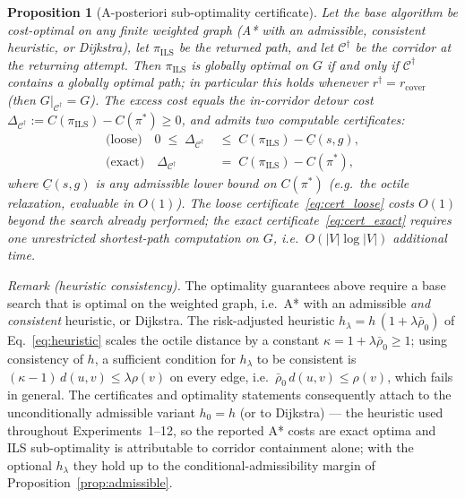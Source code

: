 \documentclass[preprint,12pt,authoryear]{elsarticle}
\newtheorem{proposition}{Proposition}
\begin{document}
\begin{proposition}[A-posteriori sub-optimality certificate]\label{prop:certificate}
Let the base algorithm be cost-optimal on any finite weighted graph (A* with an admissible, consistent heuristic, or Dijkstra), let $\pi_{\mathrm{ILS}}$ be the returned path, and let $\mathcal{C}^{\dagger}$ be the corridor at the returning attempt. Then $\pi_{\mathrm{ILS}}$ is globally optimal on $G$ if and only if $\mathcal{C}^{\dagger}$ contains a globally optimal path; in particular this holds whenever $r^{\dagger} = r_{\mathrm{cover}}$ (then $G|_{\mathcal{C}^{\dagger}} = G$). The excess cost equals the in-corridor detour cost $\Delta_{\mathcal{C}^{\dagger}} := C(\pi_{\mathrm{ILS}}) - C(\pi^*) \geq 0$, and admits two computable certificates:
\begin{align}
\text{(loose)}\quad 0 \;\leq\; \Delta_{\mathcal{C}^{\dagger}} &\;\leq\; C(\pi_{\mathrm{ILS}}) - \underline{C}(s,g), \label{eq:cert_loose}\\
\text{(exact)}\quad \Delta_{\mathcal{C}^{\dagger}} &\;=\; C(\pi_{\mathrm{ILS}}) - C(\pi^*), \label{eq:cert_exact}
\end{align}
where $\underline{C}(s,g)$ is any admissible lower bound on $C(\pi^*)$ (e.g.\ the octile relaxation, evaluable in $O(1)$). The loose certificate~\eqref{eq:cert_loose} costs $O(1)$ beyond the search already performed; the exact certificate~\eqref{eq:cert_exact} requires one unrestricted shortest-path computation on $G$, i.e.\ $O(|V|\log|V|)$ additional time.
\end{proposition}

\noindent\textit{Remark (heuristic consistency).}
The optimality guarantees above require a base search that is optimal on the weighted graph, i.e.\ A* with an admissible \emph{and consistent} heuristic, or Dijkstra. The risk-adjusted heuristic $h_\lambda = h\,(1+\lambda\bar{\rho}_0)$ of Eq.~\eqref{eq:heuristic} scales the octile distance by a constant $\kappa = 1+\lambda\bar{\rho}_0 \geq 1$; using consistency of $h$, a sufficient condition for $h_\lambda$ to be consistent is $(\kappa-1)\,d(u,v) \leq \lambda\rho(v)$ on every edge, i.e.\ $\bar{\rho}_0\,d(u,v) \leq \rho(v)$, which fails in general. The certificates and optimality statements consequently attach to the unconditionally admissible variant $h_0 = h$ (or to Dijkstra) --- the heuristic used throughout Experiments~1--12, so the reported A* costs are exact optima and ILS sub-optimality is attributable to corridor containment alone; with the optional $h_\lambda$ they hold up to the conditional-admissibility margin of Proposition~\ref{prop:admissible}.
\end{document}
